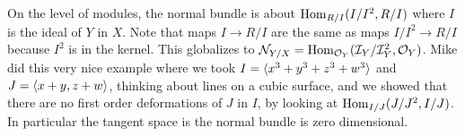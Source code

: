 \documentclass[12pt]{article}
\begin{document}
On the level of modules, the normal bundle is about 
$\operatorname{Hom}_{R/I}(I/I^2,R/I)$ where $I$ is the ideal of $Y$ in $X$. Note that maps $I\to R/I$ are
the same as maps $I/I^2\to R/I$ because $I^2$ is in the kernel. 
This globalizes to 
${\mathcal{N}}_{Y/X} = \operatorname{Hom}_{{\mathcal{O}}_Y}({\mathcal{I}}_Y/{\mathcal{I}}_Y^2,{\mathcal{O}}_Y)$. Mike did this very nice example where
we took $I = \langle{x^3 + y^3 + z^3 + w^3}\rangle$ and $J = \langle{x+y,z+w}\rangle$, thinking about lines on a
cubic surface, and we showed that there are no first order deformations of $J$ in $I$,
by looking at $\operatorname{Hom}_{I/J}(J/J^2,I/J)$. In particular the tangent space is the normal bundle 
is zero dimensional. 
\end{document}
